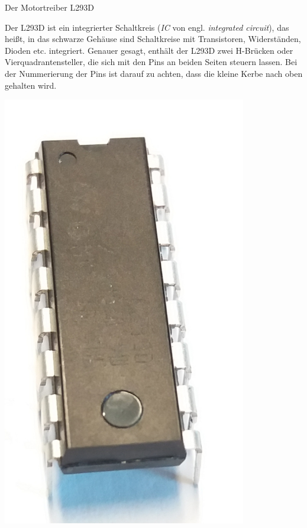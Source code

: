 \begin{zsfg}{Der Motortreiber L293D}
	
	\medskip
	\begin{minipage}{0.7\textwidth}
		Der L293D ist ein integrierter Schaltkreis (\emph{IC} von engl. \emph{integrated circuit}), das heißt, in das schwarze Gehäuse sind Schaltkreise mit Transistoren, Widerständen, Dioden etc. integriert. Genauer gesagt, enthält der L293D zwei H-Brücken oder Vierquadrantensteller, die sich mit den Pins an beiden Seiten steuern lassen. Bei der Nummerierung der Pins ist darauf zu achten, dass die kleine Kerbe nach oben gehalten wird.
	\end{minipage}
	\hfill
	\begin{minipage}{0.28\textwidth}
		\begin{minipage}{0.48\textwidth}
			\centering
			\includegraphics[width=0.8\textwidth]{./pics/l293d.jpg}

\end{minipage}
\end{minipage}
\end{zsfg}
